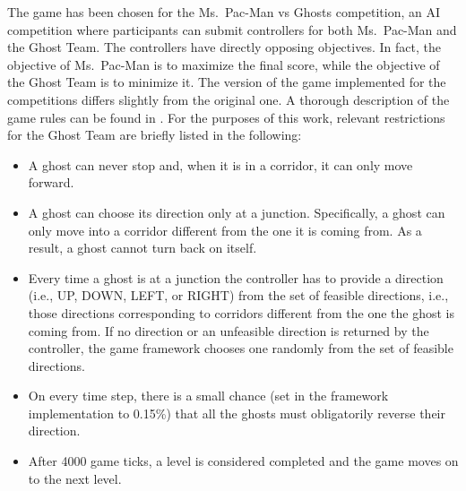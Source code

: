 \documentclass[journal]{IEEEtran}
\begin{document}
The game has been chosen for the Ms.\  Pac-Man vs Ghosts competition, an AI competition where participants can submit controllers for both Ms.\  Pac-Man and the Ghost Team. The controllers have directly opposing objectives. In fact, the objective of Ms.\  Pac-Man is to maximize the final score, while the objective of the Ghost Team is to minimize it. The version of the game implemented for the competitions differs slightly from the original one. A thorough description of the game rules can be found in \cite{MsPacManVSGhost2011}. For the purposes of this work, relevant restrictions for the Ghost Team are briefly listed in the following:
\begin{itemize}
  \item A ghost can never stop and, when it is in a corridor, it can only move forward.
  \item A ghost can choose its direction only at a junction. Specifically, a ghost can only move into a corridor different from the one it is coming from. As a result, a ghost cannot turn back on itself.
  \item Every time a ghost is at a junction the controller has to provide a direction (i.e., UP, DOWN, LEFT, or RIGHT) from the set of feasible directions, i.e., those directions corresponding to corridors different from the one the ghost is coming from. If no direction or an unfeasible direction is returned by the controller, the game framework chooses one randomly from the set of feasible directions.
  \item On every time step, there is a small chance (set in the framework implementation to 0.15\%) that all the ghosts must obligatorily reverse their direction.
  \item After 4000 game ticks, a level is considered completed and the game moves on to the next level.
\end{itemize}
\end{document}

